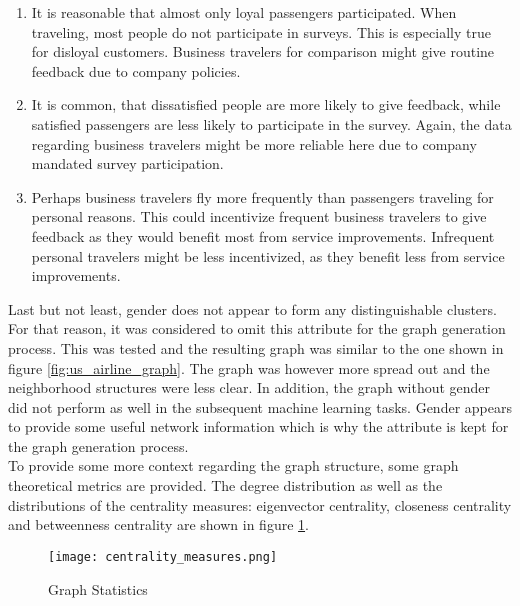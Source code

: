   \begin{enumerate}
    \item It is reasonable that almost only loyal passengers participated. When 
      traveling, most people do not participate in surveys. This is especially 
      true for disloyal customers. Business travelers for comparison might give
      routine feedback due to company policies.
    \item It is common, that dissatisfied people are more likely to give
      feedback, while satisfied passengers are less likely to participate in
      the survey. Again, the data regarding business travelers might be more
      reliable here due to company mandated survey participation.
    \item Perhaps business travelers fly more frequently than passengers
      traveling for personal reasons. This could incentivize frequent business
      travelers to give feedback as they would benefit most from service
      improvements. Infrequent personal travelers might be less incentivized,
      as they benefit less from service improvements. 
  \end{enumerate}

  \noindent Last but not least, gender does not appear to form any distinguishable 
  clusters. For that reason, it was considered to omit this attribute for the 
  graph generation process. This was tested and the resulting graph was similar
  to the one shown in figure \ref{fig:us_airline_graph}. The graph was however 
  more spread out and the neighborhood structures were less clear. In addition, 
  the graph without gender did not perform as well in the subsequent machine 
  learning tasks. Gender appears to provide some useful network information 
  which is why the attribute is kept for the graph generation process. \\

  \noindent To provide some more context regarding the graph structure, some
  graph theoretical metrics are provided. The degree distribution as well as 
  the distributions of the centrality measures: eigenvector centrality, 
  closeness centrality and betweenness centrality are shown in 
  figure \ref{fig:centrality_measures}.

  \begin{figure}[h]
	  \centering
	  \texttt{[image: centrality\_measures.png]}
	  \caption{Graph Statistics}
      \label{fig:centrality_measures}
  \end{figure}

